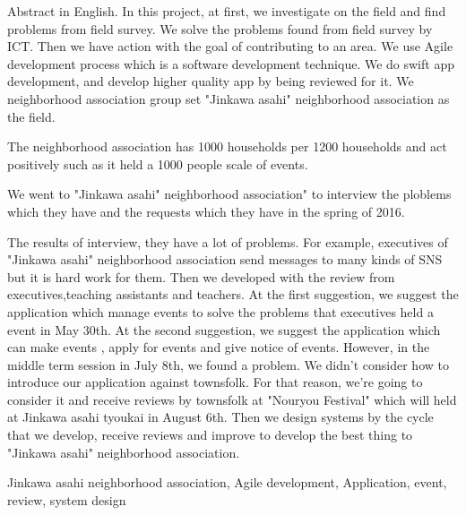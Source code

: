 \begin{eabstract} Abstract in English.
In this project, at first, we investigate on the field and find problems from field survey. We solve the problems found from field survey by ICT. Then we have action with the goal of contributing to an area. We use Agile development process which is a software development technique. We do swift app development, and develop higher quality app by being reviewed for it.
We neighborhood association
 group set "Jinkawa asahi" neighborhood association as the field.

The neighborhood association has 1000 households per 1200 households and act positively such as it held a 1000 people scale of events.

We went to "Jinkawa asahi" neighborhood association" to interview the ploblems which they have and the requests which they have in the spring of 2016.

The results of interview, they have a lot of problems. For example, executives of "Jinkawa asahi" neighborhood association send messages to many kinds of SNS but it is hard work for them. Then we developed with the review from executives,teaching assistants and teachers. At the first suggestion, we suggest the application which manage events to solve the problems that executives held a event in May 30th. At the second suggestion, we suggest the application which can make events , apply for events and give notice of events. However, in the middle term session in July 8th, we found a problem. We didn't consider how to introduce our application against townsfolk. For that reason, we're going to consider it and receive reviews by townsfolk at "Nouryou Festival" which will held at Jinkawa asahi tyoukai in August 6th. Then we design systems by the cycle that we develop, receive reviews and improve to develop the best thing to "Jinkawa asahi" neighborhood association.
\begin{ekeyword}
Jinkawa asahi neighborhood association, Agile development, Application, event, review, system design
\end{ekeyword}
\end{eabstract}
